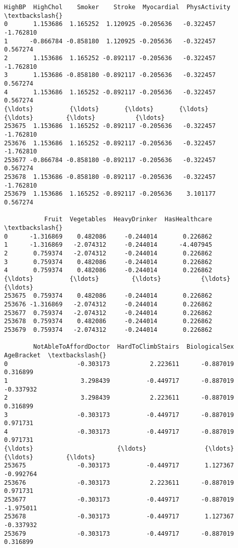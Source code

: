 \documentclass[11pt]{article}
\begin{document}
    \begin{Verbatim}[commandchars=\\\{\}]
          HighBP  HighChol    Smoker    Stroke  Myocardial  PhysActivity  \textbackslash{}
0       1.153686  1.165252  1.120925 -0.205636   -0.322457     -1.762810
1      -0.866784 -0.858180  1.120925 -0.205636   -0.322457      0.567274
2       1.153686  1.165252 -0.892117 -0.205636   -0.322457     -1.762810
3       1.153686 -0.858180 -0.892117 -0.205636   -0.322457      0.567274
4       1.153686  1.165252 -0.892117 -0.205636   -0.322457      0.567274
{\ldots}          {\ldots}       {\ldots}       {\ldots}       {\ldots}         {\ldots}           {\ldots}
253675  1.153686  1.165252 -0.892117 -0.205636   -0.322457     -1.762810
253676  1.153686  1.165252 -0.892117 -0.205636   -0.322457     -1.762810
253677 -0.866784 -0.858180 -0.892117 -0.205636   -0.322457      0.567274
253678  1.153686 -0.858180 -0.892117 -0.205636   -0.322457     -1.762810
253679  1.153686  1.165252 -0.892117 -0.205636    3.101177      0.567274

           Fruit  Vegetables  HeavyDrinker  HasHealthcare  \textbackslash{}
0      -1.316869    0.482086     -0.244014       0.226862
1      -1.316869   -2.074312     -0.244014      -4.407945
2       0.759374   -2.074312     -0.244014       0.226862
3       0.759374    0.482086     -0.244014       0.226862
4       0.759374    0.482086     -0.244014       0.226862
{\ldots}          {\ldots}         {\ldots}           {\ldots}            {\ldots}
253675  0.759374    0.482086     -0.244014       0.226862
253676 -1.316869   -2.074312     -0.244014       0.226862
253677  0.759374   -2.074312     -0.244014       0.226862
253678  0.759374    0.482086     -0.244014       0.226862
253679  0.759374   -2.074312     -0.244014       0.226862

        NotAbleToAffordDoctor  HardToClimbStairs  BiologicalSex  AgeBracket  \textbackslash{}
0                   -0.303173           2.223611      -0.887019    0.316899
1                    3.298439          -0.449717      -0.887019   -0.337932
2                    3.298439           2.223611      -0.887019    0.316899
3                   -0.303173          -0.449717      -0.887019    0.971731
4                   -0.303173          -0.449717      -0.887019    0.971731
{\ldots}                       {\ldots}                {\ldots}            {\ldots}         {\ldots}
253675              -0.303173          -0.449717       1.127367   -0.992764
253676              -0.303173           2.223611      -0.887019    0.971731
253677              -0.303173          -0.449717      -0.887019   -1.975011
253678              -0.303173          -0.449717       1.127367   -0.337932
253679              -0.303173          -0.449717      -0.887019    0.316899


\end{Verbatim}
\end{document}
